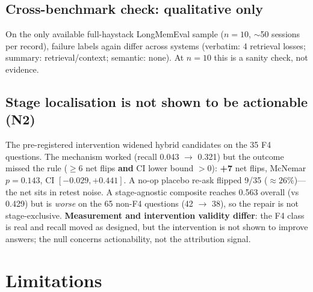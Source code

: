 \documentclass[11pt]{article}
\begin{document}
\subsection{Cross-benchmark check: qualitative only}

On the only available full-haystack LongMemEval sample ($n = 10$, ${\sim}$50
sessions per record), failure labels again differ across systems (verbatim: 4
retrieval losses; summary: retrieval/context; semantic: none). At $n = 10$
this is a sanity check, not evidence.

\subsection{Stage localisation is not shown to be actionable (N2)}

The pre-registered intervention widened hybrid candidates on the 35 F4
questions. The mechanism worked (recall 0.043 $\to$ 0.321) but the outcome
missed the rule ($\geq 6$ net flips \textbf{and} CI lower bound $> 0$):
\textbf{+7} net flips, McNemar $p = 0.143$, CI $[-0.029, +0.441]$. A no-op
placebo re-ask flipped 9/35 (${\approx}26\%$)---the net sits in retest noise.
A stage-agnostic composite reaches 0.563 overall (vs 0.429) but is
\emph{worse} on the 65 non-F4 questions (42 $\to$ 38), so the repair is not
stage-exclusive. \textbf{Measurement and intervention validity differ}: the F4
class is real and recall moved as designed, but the intervention is not shown
to improve answers; the null concerns actionability, not the attribution
signal.

\section*{Limitations}
\end{document}
